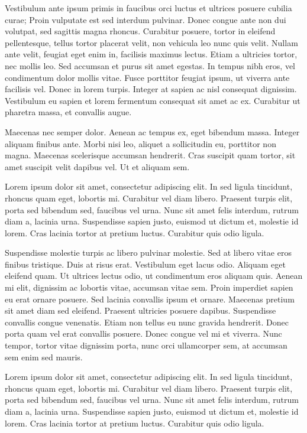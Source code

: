 Vestibulum ante ipsum primis in faucibus orci luctus et ultrices posuere cubilia curae; Proin vulputate est sed interdum pulvinar. Donec congue ante non dui volutpat, sed sagittis magna rhoncus. Curabitur posuere, tortor in eleifend pellentesque, tellus tortor placerat velit, non vehicula leo nunc quis velit. Nullam ante velit, feugiat eget enim in, facilisis maximus lectus. Etiam a ultricies tortor, nec mollis leo. Sed accumsan et purus sit amet egestas. In tempus nibh eros, vel condimentum dolor mollis vitae. Fusce porttitor feugiat ipsum, ut viverra ante facilisis vel. Donec in lorem turpis. Integer at sapien ac nisl consequat dignissim. Vestibulum eu sapien et lorem fermentum consequat sit amet ac ex. Curabitur ut pharetra massa, et convallis augue.

Maecenas nec semper dolor. Aenean ac tempus ex, eget bibendum massa. Integer aliquam finibus ante. Morbi nisi leo, aliquet a sollicitudin eu, porttitor non magna. Maecenas scelerisque accumsan hendrerit. Cras suscipit quam tortor, sit amet suscipit velit dapibus vel. Ut et aliquam sem.

Lorem ipsum dolor sit amet, consectetur adipiscing elit. In sed ligula tincidunt, rhoncus quam eget, lobortis mi. Curabitur vel diam libero. Praesent turpis elit, porta sed bibendum sed, faucibus vel urna. Nunc sit amet felis interdum, rutrum diam a, lacinia urna. Suspendisse sapien justo, euismod ut dictum et, molestie id lorem. Cras lacinia tortor at pretium luctus. Curabitur quis odio ligula.

Suspendisse molestie turpis ac libero pulvinar molestie. Sed at libero vitae eros finibus tristique. Duis at risus erat. Vestibulum eget lacus odio. Aliquam eget eleifend quam. Ut ultrices lectus odio, ut condimentum eros aliquam quis. Aenean mi elit, dignissim ac lobortis vitae, accumsan vitae sem. Proin imperdiet sapien eu erat ornare posuere. Sed lacinia convallis ipsum et ornare. Maecenas pretium sit amet diam sed eleifend. Praesent ultricies posuere dapibus. Suspendisse convallis congue venenatis. Etiam non tellus eu nunc gravida hendrerit. Donec porta quam vel erat convallis posuere. Donec congue vel mi et viverra. Nunc tempor, tortor vitae dignissim porta, nunc orci ullamcorper sem, at accumsan sem enim sed mauris. 


Lorem ipsum dolor sit amet, consectetur adipiscing elit. In sed ligula tincidunt, rhoncus quam eget, lobortis mi. Curabitur vel diam libero. Praesent turpis elit, porta sed bibendum sed, faucibus vel urna. Nunc sit amet felis interdum, rutrum diam a, lacinia urna. Suspendisse sapien justo, euismod ut dictum et, molestie id lorem. Cras lacinia tortor at pretium luctus. Curabitur quis odio ligula.


